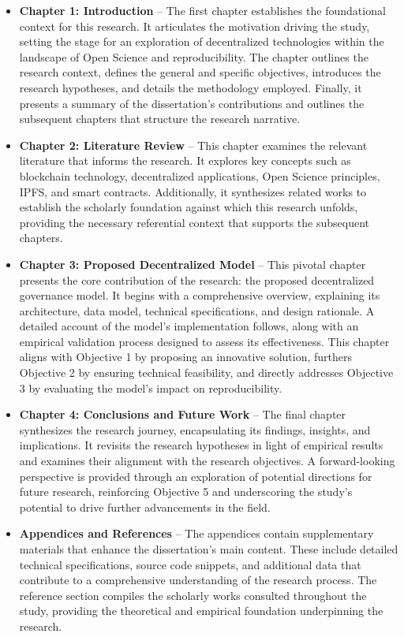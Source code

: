 \documentclass{article}
\begin{document}
\begin{itemize}
    \item \textbf{Chapter 1: Introduction} – The first chapter establishes the foundational context for this research. It articulates the motivation driving the study, setting the stage for an exploration of decentralized technologies within the landscape of Open Science and reproducibility. The chapter outlines the research context, defines the general and specific objectives, introduces the research hypotheses, and details the methodology employed. Finally, it presents a summary of the dissertation’s contributions and outlines the subsequent chapters that structure the research narrative.

    \item \textbf{Chapter 2: Literature Review} – This chapter examines the relevant literature that informs the research. It explores key concepts such as blockchain technology, decentralized applications, Open Science principles, IPFS, and smart contracts. Additionally, it synthesizes related works to establish the scholarly foundation against which this research unfolds, providing the necessary referential context that supports the subsequent chapters.

    \item \textbf{Chapter 3: Proposed Decentralized Model} – This pivotal chapter presents the core contribution of the research: the proposed decentralized governance model. It begins with a comprehensive overview, explaining its architecture, data model, technical specifications, and design rationale. A detailed account of the model’s implementation follows, along with an empirical validation process designed to assess its effectiveness. This chapter aligns with Objective 1 by proposing an innovative solution, furthers Objective 2 by ensuring technical feasibility, and directly addresses Objective 3 by evaluating the model’s impact on reproducibility.

    \item \textbf{Chapter 4: Conclusions and Future Work} – The final chapter synthesizes the research journey, encapsulating its findings, insights, and implications. It revisits the research hypotheses in light of empirical results and examines their alignment with the research objectives. A forward-looking perspective is provided through an exploration of potential directions for future research, reinforcing Objective 5 and underscoring the study’s potential to drive further advancements in the field.

    \item \textbf{Appendices and References} – The appendices contain supplementary materials that enhance the dissertation’s main content. These include detailed technical specifications, source code snippets, and additional data that contribute to a comprehensive understanding of the research process. The reference section compiles the scholarly works consulted throughout the study, providing the theoretical and empirical foundation underpinning the research.

\end{itemize}




\end{document}
